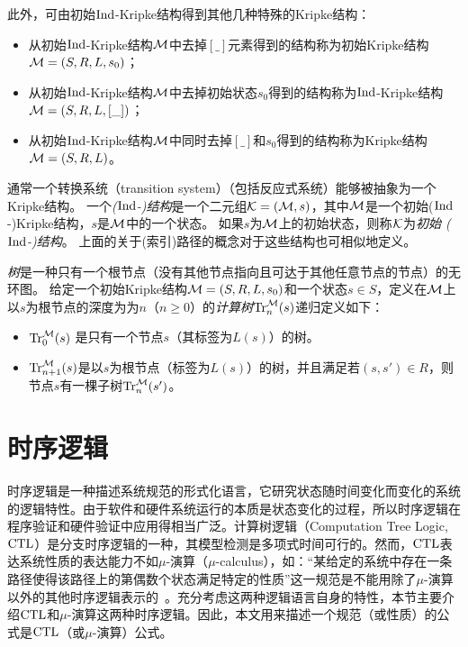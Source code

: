 此外，可由初始$\textrm{Ind}$-Kripke结构得到其他几种特殊的Kripke结构：
\begin{itemize}
	\item 从初始$\textrm{Ind}$-Kripke结构${\cal M}$中去掉$[\_]$元素得到的结构称为初始Kripke结构${\cal M}=(S,R,L,s_0)$；
	\item 从初始$\textrm{Ind}$-Kripke结构${\cal M}$中去掉初始状态$s_0$得到的结构称为$\textrm{Ind}$-Kripke结构${\cal M}=(S,R,L,[\_])$；
	\item 从初始$\textrm{Ind}$-Kripke结构${\cal M}$中同时去掉$[\_]$和$s_0$得到的结构称为Kripke结构${\cal M}=(S,R,L)$。
\end{itemize}
通常一个转换系统（transition system）（包括反应式系统）能够被抽象为一个Kripke结构\cite{Baier:PMC:2008}。
一个\emph{($\textrm{Ind}$-)结构}是一个二元组${\cal K}=({\cal M}, s)$，其中${\cal M}$是一个初始($\textrm{Ind}$-)Kripke结构，$s$是${\cal M}$中的一个状态。
如果$s$为${\cal M}$上的初始状态，则称${\cal K}$为{\em 初始 ($\textrm{Ind}$-)结构}。
上面的关于(索引)路径的概念对于这些结构也可相似地定义。
 
 






\emph{树}是一种只有一个根节点（没有其他节点指向且可达于其他任意节点的节点）的无环图。
给定一个初始Kripke结构${\cal M}=(S,R,L,s_0)$和一个状态$s\in S$，定义在${\cal M}$上以$s$为根节点的深度为为$n$（$n\ge 0$）的\emph{计算树}$\textrm{Tr}_n^{{\cal M}}(s)$递归定义如下\cite{browne1988characterizing}：
\begin{itemize}
	\item $\textrm{Tr}_0^{{\cal M}}(s)$ 是只有一个节点$s$（其标签为$L(s)$）的树。
	\item $\textrm{Tr}_{n+1}^{{\cal M}}(s)$是以$s$为根节点（标签为$L(s)$）的树，并且满足若$(s,s')\in R$，则节点$s$有一棵子树$\textrm{Tr}_{n}^{{\cal M}}(s')$。
\end{itemize}




\section{时序逻辑}
时序逻辑是一种描述系统规范的形式化语言，它研究状态随时间变化而变化的系统的逻辑特性。由于软件和硬件系统运行的本质是状态变化的过程，所以时序逻辑在程序验证和硬件验证中应用得相当广泛。计算树逻辑（Computation Tree Logic, $\textrm{CTL}$）是分支时序逻辑的一种，其模型检测是多项式时间可行的。然而，$\textrm{CTL}$表达系统性质的表达能力不如$\mu$-演算（$\mu$-calculus），如：“某给定的系统中存在一条路径使得该路径上的第偶数个状态满足特定的性质”这一规范是不能用除了$\mu$-演算以外的其他时序逻辑表示的~\cite{DBLP:series/txtcs/Schneider04}。充分考虑这两种逻辑语言自身的特性，本节主要介绍$\textrm{CTL}$和$\mu$-演算这两种时序逻辑。因此，本文用来描述一个规范（或性质）的公式是$\textrm{CTL}$（或$\mu$-演算）公式。

